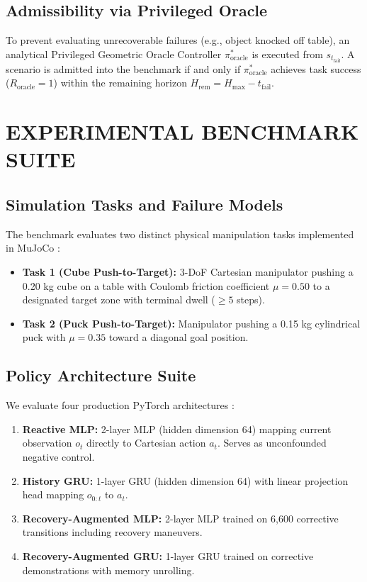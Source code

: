 \documentclass[letterpaper, 10 pt, conference]{ieeeconf}
\begin{document}
\subsection{Admissibility via Privileged Oracle}
To prevent evaluating unrecoverable failures (e.g., object knocked off table), an analytical Privileged Geometric Oracle Controller $\pi^*_{\text{oracle}}$ is executed from $s_{t_{\text{fail}}}$. A scenario is admitted into the benchmark if and only if $\pi^*_{\text{oracle}}$ achieves task success ($R_{\text{oracle}} = 1$) within the remaining horizon $H_{\text{rem}} = H_{\text{max}} - t_{\text{fail}}$.

\section{EXPERIMENTAL BENCHMARK SUITE}
\label{sec:benchmark_suite}

\subsection{Simulation Tasks and Failure Models}
The benchmark evaluates two distinct physical manipulation tasks implemented in MuJoCo \cite{towers2024gymnasium}:
\begin{itemize}
    \item \textbf{Task 1 (Cube Push-to-Target):} 3-DoF Cartesian manipulator pushing a 0.20 kg cube on a table with Coulomb friction coefficient $\mu = 0.50$ to a designated target zone with terminal dwell ($\ge 5$ steps).
    \item \textbf{Task 2 (Puck Push-to-Target):} Manipulator pushing a 0.15 kg cylindrical puck with $\mu = 0.35$ toward a diagonal goal position.
\end{itemize}

\subsection{Policy Architecture Suite}
We evaluate four production PyTorch architectures \cite{paszke2019pytorch}:
\begin{enumerate}
    \item \textbf{Reactive MLP:} 2-layer MLP (hidden dimension 64) mapping current observation $o_t$ directly to Cartesian action $a_t$. Serves as unconfounded negative control.
    \item \textbf{History GRU:} 1-layer GRU (hidden dimension 64) with linear projection head mapping $o_{0:t}$ to $a_t$.
    \item \textbf{Recovery-Augmented MLP:} 2-layer MLP trained on 6,600 corrective transitions including recovery maneuvers.
    \item \textbf{Recovery-Augmented GRU:} 1-layer GRU trained on corrective demonstrations with memory unrolling.
\end{enumerate}
\end{document}
